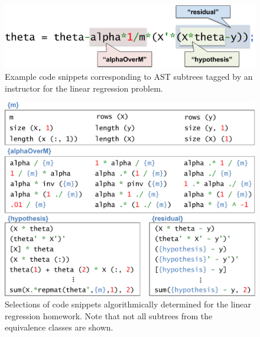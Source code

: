 \begin{figure}[t!]
\center
\includegraphics[width=.35\textwidth]{img/taggingexample.pdf}
\caption{
Example code snippets corresponding to AST subtrees tagged by an instructor for the linear regression problem.
}
\label{fig:tagging}
\end{figure}

\begin{figure}[t!]
\center
\includegraphics[width=.68\textwidth]{img/equivalencesAll.pdf}

\caption{
 Selections of code snippets algorithmically determined for the linear regression homework.  Note that not all subtrees from the equivalence classes are shown.
}
\label{fig:equivalences}
\end{figure}

